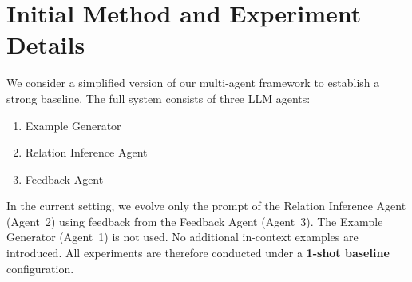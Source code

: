\documentclass[12pt]{article}
\newcommand{\tacred}{FS-TACRED}
\newcommand{\qwensmall}{Qwen3-4B}
\newcommand{\gemmasmall}{Gemma3-4B}
\begin{document}



\section{Initial Method and Experiment Details}

We consider a simplified version of our multi-agent framework to establish a strong baseline.
The full system consists of three LLM agents: 
\begin{enumerate}
    \item Example Generator
    \item Relation Inference Agent
    \item Feedback Agent
\end{enumerate}
In the current setting, we evolve only the prompt of the Relation Inference Agent (Agent~2) using feedback from the Feedback Agent (Agent~3).
The Example Generator (Agent~1) is not used.
No additional in-context examples are introduced.
All experiments are therefore conducted under a \textbf{1-shot baseline} configuration.
\end{document}
